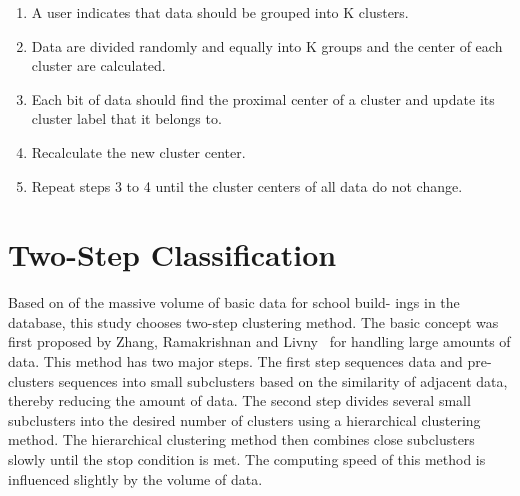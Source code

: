 \begin{enumerate}
\item A user indicates that data should be grouped into K clusters.
\item Data are divided randomly and equally into K groups and the center of each cluster are calculated.
\item Each bit of data should find the proximal center of a cluster and update its cluster label that it belongs to.
\item Recalculate the new cluster center.
\item Repeat steps 3 to 4 until the cluster centers of all data do not change.
\end{enumerate}

\section{Two-Step Classification}

Based on of the massive volume of basic data for school build- ings in the database, this study chooses two-step clustering method. The basic concept was first proposed by Zhang, Ramakrishnan and Livny~\cite{zhang1996birch} for handling large amounts of data. This method has two major steps. The first step sequences data and pre-clusters sequences into small subclusters based on the similarity of adjacent data, thereby reducing the amount of data. The second step divides several small subclusters into the desired number of clusters using a hierarchical clustering method. The hierarchical clustering method then combines close subclusters slowly until the stop condition is met. The computing speed of this method is influenced slightly by the volume of data.

